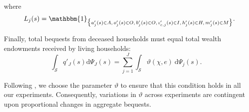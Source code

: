 \documentclass[parskip=full]{article}
\begin{document}
\noindent where
\[ \quad L_j(s) = \mathbbm{1}_{\big\{ a'_j(s) \in A,\, o'_j(s) \in O,\, b'_j(s) \in O,\, \iota'_{c,j}(s) \in I,\, h'_j(s) \in H,\, m'_j(s) \in M \big\}}.\]

Finally, total bequests from deceased households must equal total wealth endowments received by living households:
\begin{equation}\label{market_clearing:agg_bequests}
    \int_{\mathcal{S}} q'_{J}(s) \mathrm{d}\Psi_{J}(s) = \sum_{j=1}^J \int_{\mathcal{S}} \vartheta (\chi,e)\ \mathrm{d}\Psi_j(s).
\end{equation}

\noindent Following \citet{kkk-2021}, we choose the parameter $\vartheta$ to ensure that this condition holds in all our experiments. Consequently, variations in $\vartheta$ across experiments are contingent upon proportional changes in aggregate bequests.
\end{document}

